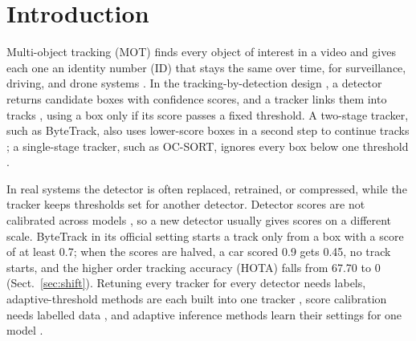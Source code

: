\documentclass[pdflatex,sn-mathphys-num,iicol]{sn-jnl}
\begin{document}
\maketitle

\section{Introduction}\label{sec:intro}

Multi-object tracking (MOT) finds every object of interest in a video and gives each one an
identity number (ID) that stays the same over time, for surveillance, driving, and drone systems
\cite{zhu2022visdrone}. In the tracking-by-detection design \cite{adzemovic2026survey}, a detector
returns candidate boxes with confidence scores, and a tracker links them into tracks
\cite{bewley2016sort,zhang2022bytetrack,cao2023ocsort}, using a box only if its score passes a fixed
threshold. A two-stage tracker, such as ByteTrack, also uses lower-score boxes in a second step to
continue tracks \cite{zhang2022bytetrack}; a single-stage tracker, such as OC-SORT, ignores every box
below one threshold \cite{cao2023ocsort}.

In real systems the detector is often replaced, retrained, or compressed, while the tracker keeps
thresholds set for another detector. Detector scores are not calibrated across models
\cite{kuppers2020detcalib}, so a new detector usually gives scores on a different scale. ByteTrack in
its official setting starts a track only from a box with a score of at least 0.7; when the scores
are halved, a car scored 0.9 gets 0.45, no track starts, and the higher order tracking accuracy
(HOTA) \cite{luiten2021hota} falls from 67.70 to 0 (Sect.~\ref{sec:shift}). Retuning every tracker
for every detector needs labels, adaptive-threshold methods are each built into one tracker
\cite{ma2023adaptivebytetrack,shim2024adaptrack,act2026adaptive}, score calibration needs labelled
data \cite{kuppers2020detcalib}, and adaptive inference methods learn their settings for one model
\cite{han2022dynamic}.
\end{document}
